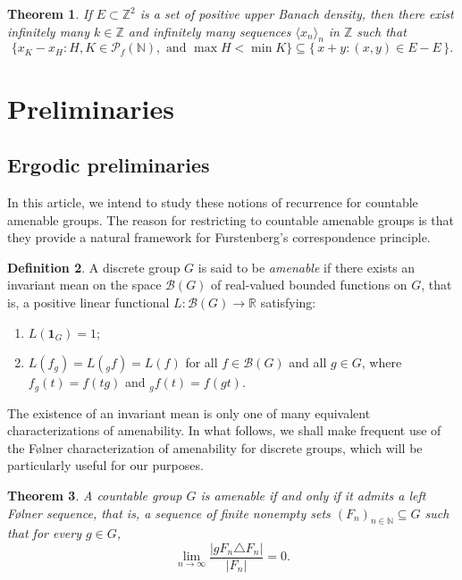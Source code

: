 \documentclass{article}
\theoremstyle{Theorem}
\newtheorem{thm}{Theorem}[section]
\theoremstyle{definition}
\newtheorem{defn}[thm]{Definition}
\newcommand{\Z}{\mathbb{Z}}
\begin{document}
\begin{thm}\label{new2}
  If  \(E \subset \mathbb{Z}^2\) is a set of positive upper Banach density, then there exist infinitely many $k\in \Z$ and infinitely many sequences $\langle x_n\rangle_n$ in $\Z$ such that 
  \[
\{x_K-x_H: H,K\in \mathcal{P}_{f}\left(\mathbb{N}\right),\text{ and }\max H<\min K\} \subseteq \{\, x+y : (x,y) \in E - E \,\}.
\]
\end{thm}

 
\section{Preliminaries}

\subsection{Ergodic preliminaries}

In this article, we intend to study these notions of recurrence for countable
amenable groups. The reason for restricting to countable amenable groups is that
they provide a natural framework for Furstenberg's correspondence principle. 

\begin{defn}
A discrete group $G$ is said to be \emph{amenable} if there exists an invariant
mean on the space $\mathcal{B}(G)$ of real-valued bounded functions on $G$, that
is, a positive linear functional $L : \mathcal{B}(G) \to \mathbb{R}$ satisfying:
\begin{enumerate}
\item $L(\mathbf{1}_G) = 1$;
\item $L(f_g) = L({}_g f) = L(f)$ for all $f \in \mathcal{B}(G)$ and all
$g \in G$, where $f_g(t) = f(tg)$ and ${}_g f(t) = f(gt)$.
\end{enumerate}
\end{defn}

The existence of an invariant mean is only one of many equivalent
characterizations of amenability. In what follows, we shall make frequent use
of the Følner characterization of amenability for discrete groups, which will
be particularly useful for our purposes.


\begin{thm}
A countable group $G$ is amenable if and only if it admits a left Følner
sequence, that is, a sequence of finite nonempty sets
$(F_n)_{n \in \mathbb{N}} \subseteq G$ such that for every $g \in G$,
\[
\lim_{n \to \infty} \frac{|gF_n \triangle F_n|}{|F_n|} = 0.
\]
\end{thm}
\end{document}
